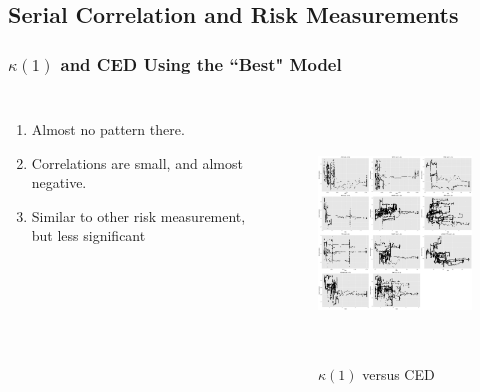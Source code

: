 \documentclass{beamer}
\newcommand\Fontviii{\fontsize{8}{9.2}\selectfont}
\begin{document}
\subsection{Serial Correlation and Risk Measurements}
\begin{frame}
\frametitle{$\kappa(1)$ and CED Using the ``Best" Model}
\Fontviii
\begin{columns}[c]
\begin{enumerate}
\item Almost no pattern there.
\item Correlations are small, and almost negative.
\item Similar to other risk measurement, but less significant
\end{enumerate}
 
 
\begin{figure}[h]
\centering 
\includegraphics[width=6cm,height = 6cm]{../figures/SerCol-CED3mon2yr}
\label{fig:SerCol-CED3mon2yr}
\caption{$\kappa(1)$ versus CED}
\end{figure}

\end{columns}
\end{frame}



\end{document}
